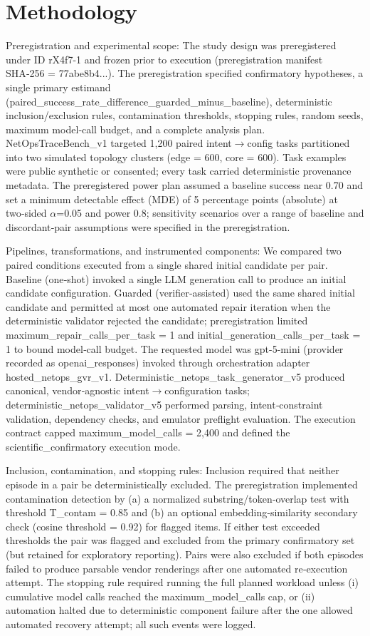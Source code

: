\documentclass[conference]{IEEEtran}
\begin{document}
\section{Methodology}
Preregistration and experimental scope: The study design was preregistered under ID rX4f7-1 and frozen prior to execution (preregistration manifest SHA‑256 = 77abe8b4...). The preregistration specified confirmatory hypotheses, a single primary estimand (paired\_success\_rate\_difference\_guarded\_minus\_baseline), deterministic inclusion/exclusion rules, contamination thresholds, stopping rules, random seeds, maximum model‑call budget, and a complete analysis plan. NetOpsTraceBench\_v1 targeted 1,200 paired intent\ensuremath{\rightarrow}config tasks partitioned into two simulated topology clusters (edge = 600, core = 600). Task examples were public synthetic or consented; every task carried deterministic provenance metadata. The preregistered power plan assumed a baseline success near 0.70 and set a minimum detectable effect (MDE) of 5 percentage points (absolute) at two‑sided \ensuremath{\alpha}=0.05 and power 0.8; sensitivity scenarios over a range of baseline and discordant‑pair assumptions were specified in the preregistration.

Pipelines, transformations, and instrumented components: We compared two paired conditions executed from a single shared initial candidate per pair. Baseline (one‑shot) invoked a single LLM generation call to produce an initial candidate configuration. Guarded (verifier‑assisted) used the same shared initial candidate and permitted at most one automated repair iteration when the deterministic validator rejected the candidate; preregistration limited maximum\_repair\_calls\_per\_task = 1 and initial\_generation\_calls\_per\_task = 1 to bound model‑call budget. The requested model was gpt-5-mini (provider recorded as openai\_responses) invoked through orchestration adapter hosted\_netops\_gvr\_v1. Deterministic\_netops\_task\_generator\_v5 produced canonical, vendor‑agnostic intent\ensuremath{\rightarrow}configuration tasks; deterministic\_netops\_validator\_v5 performed parsing, intent‑constraint validation, dependency checks, and emulator preflight evaluation. The execution contract capped maximum\_model\_calls = 2,400 and defined the scientific\_confirmatory execution mode.

Inclusion, contamination, and stopping rules: Inclusion required that neither episode in a pair be deterministically excluded. The preregistration implemented contamination detection by (a) a normalized substring/token‑overlap test with threshold T\_contam = 0.85 and (b) an optional embedding‑similarity secondary check (cosine threshold = 0.92) for flagged items. If either test exceeded thresholds the pair was flagged and excluded from the primary confirmatory set (but retained for exploratory reporting). Pairs were also excluded if both episodes failed to produce parsable vendor renderings after one automated re‑execution attempt. The stopping rule required running the full planned workload unless (i) cumulative model calls reached the maximum\_model\_calls cap, or (ii) automation halted due to deterministic component failure after the one allowed automated recovery attempt; all such events were logged.
\end{document}
